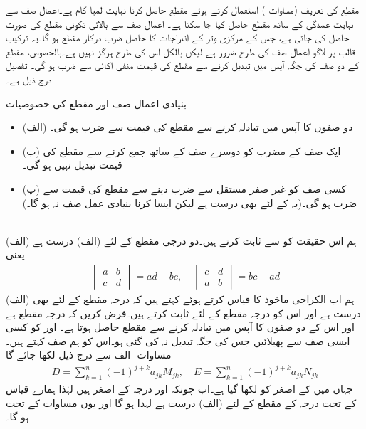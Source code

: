 مقطع کی تعریف (مساوات ) استعمال کرتے ہوئے مقطع حاصل کرنا نہایت لمبا کام ہے۔اعمال صف سے نہایت عمدگی کے ساتھ مقطع حاصل کیا جا سکتا ہے۔ اعمال صف سے بالائی تکونی مقطع کی صورت حاصل کی جاتی ہے، جس کے مرکزی وتر کے اندراجات کا حاصل ضرب درکار مقطع ہو گا۔یہ ترکیب قالب پر لاگو اعمال صف کی طرح ضرور ہے لیکن بالکل اس کی طرح ہرگز نہیں ہے۔بالخصوص، مقطع کے دو صف کی جگہ آپس میں تبدیل کرنے سے مقطع کی قیمت منفی اکائی  سے ضرب ہو گی۔ تفصیل درج ذیل ہے۔

\quad بنیادی اعمال صف اور مقطع کی خصوصیات\\
\begin{itemize}
\item{(الف)}
دو صفوں کا آپس میں تبادلہ کرنے سے مقطع کی قیمت  سے ضرب ہو گی۔
\item{(ب)}
ایک صف کے مضرب کو دوسرے صف کے ساتھ جمع کرنے سے مقطع کی قیمت تبدیل نہیں ہو گی۔
\item{(پ)}
کسی صف کو غیر صفر مستقل  سے ضرب دینے سے مقطع کی قیمت  سے ضرب ہو گی۔(یہ  کے لئے بھی درست ہے لیکن ایسا کرنا بنیادی عمل صف نہ ہو گا۔)
\end{itemize}

\\ 
 (الف) \quad  ہم اس حقیقت کو  سے ثابت کرتے ہیں۔دو درجی  مقطع  کے لئے (الف) درست ہے  یعنی
\begin{align*}
\begin{vmatrix} a&b\\c&d \end{vmatrix}=ad-bc,\quad \begin{vmatrix} c&d\\a&b \end{vmatrix}=bc-ad
\end{align*}
ہم اب الکراجی ماخوذ کا قیاس کرتے ہوئے کہتے ہیں کہ درجہ  مقطع کے لئے بھی (الف) درست ہے اور اس کو درجہ  مقطع کے لئے ثابت کرتے ہیں۔فرض کریں کہ  درجہ  مقطع ہے اور اس کے دو صفوں کا آپس میں تبادلہ کرنے سے  مقطع حاصل ہوتا ہے۔ اور  کو کسی ایسی صف سے پھیلائیں جس کی جگہ تبدیل نہ کی گئی ہو۔اس کو ہم  صف کہتے ہیں۔ مساوات -الف سے درج ذیل لکھا جائے گا
\begin{align}\label{مساوات_الجبرا_اصغر_مجموعہ_الف}
D=\sum_{k=1}^{n} (-1)^{j+k} a_{jk} M_{jk},\quad E=\sum_{k=1}^{n} (-1)^{j+k} a_{jk} N_{jk}
\end{align}
جہاں  میں  کے اصغر کو  لکھا گیا ہے۔اب چونکہ  اور  درجہ  کے اصغر ہیں لہٰذا ہمارے قیاس کے تحت درجہ  کے مقطع کے لئے (الف) درست ہے لہٰذا  ہو گا اور یوں مساوات  کے تحت   ہو گا۔

